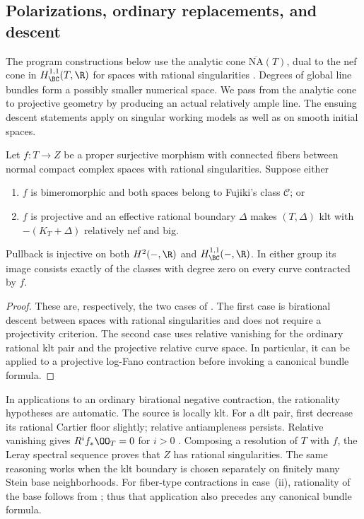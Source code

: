 \subsection{Polarizations, ordinary replacements, and descent}
\label{prog:foundations}

The program constructions below use the analytic cone
\(\overline{\mathrm{NA}}(T)\), dual to the nef cone in
\(H^{1,1}_{\BC}(T,\R)\) for spaces with rational singularities
\cite[Proposition~2.4]{DHP}. Degrees of global line bundles form a
possibly smaller numerical space. We pass from the analytic cone to
projective geometry by producing an actual relatively ample line.
The ensuing descent statements apply on singular working models as
well as on smooth initial spaces.

\begin{lemma}
\label{prog:bc-descent}
Let \(f:T\to Z\) be a proper surjective morphism with connected fibers
between normal compact complex spaces with rational singularities.
Suppose either
\begin{enumerate}
\item \(f\) is bimeromorphic and both spaces belong to Fujiki's class
\(\mathcal C\); or
\item \(f\) is projective and an effective rational boundary
\(\Delta\) makes \((T,\Delta)\) klt with
\(-(K_T+\Delta)\) relatively nef and big.
\end{enumerate}
Pullback is injective on both \(H^2(-,\R)\) and
\(H^{1,1}_{\BC}(-,\R)\). In either group its image consists exactly
of the classes with degree zero on every curve contracted by \(f\).
\end{lemma}

\begin{proof}
These are, respectively, the two cases of
\cite[Lemma~2.6(1),(2)]{DH2024}. The first case is birational descent
between spaces with rational singularities and does not require a
projectivity criterion. The second case uses relative vanishing for
the ordinary rational klt pair and the projective relative curve
space. In particular, it can be applied to a projective log-Fano
contraction before invoking a canonical bundle formula.
\end{proof}

In applications to an ordinary birational negative contraction,
the rationality hypotheses are automatic. The source is locally klt.
For a dlt pair, first decrease its rational Cartier floor slightly;
relative antiampleness persists. Relative vanishing gives
\(R^if_*\OO_T=0\) for \(i>0\)
\cite[Theorem~5.2]{FujinoAnalyticBCHM}. Composing a resolution of \(T\)
with \(f\), the Leray spectral sequence proves that \(Z\) has rational
singularities. The same reasoning works when the klt boundary is
chosen separately on finitely many Stein base neighborhoods. For
fiber-type contractions in case~(ii), rationality of the base follows
from \cite[Lemma~8.8(i)]{DHP}; thus that application also precedes
any canonical bundle formula.

